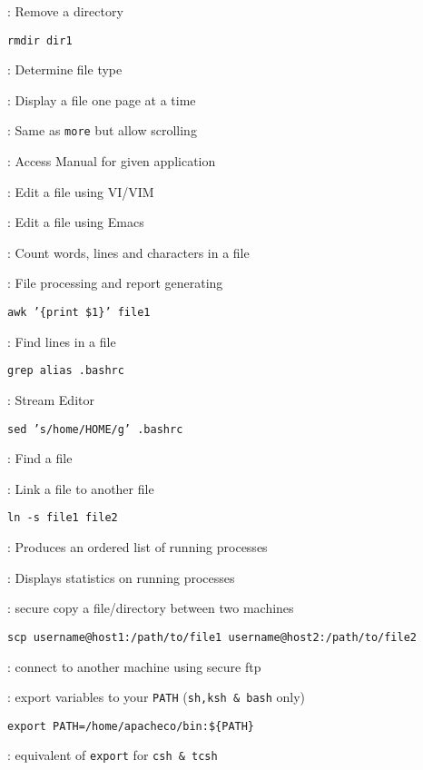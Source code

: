 \documentclass[slidestop,mathserif,compress,xcolor=svgnames]{beamer}
\newcommand*\vardiamond{\textcolor{tigerspurple}{%
  \ensuremath{\blacklozenge}}}
\begin{document}
\begin{frame}[allowframebreaks]
\begin{itemize}
{    \item[\texttt{rmdir}]: Remove a directory
    {\tiny\item[$\vardiamond$] \texttt{rmdir dir1}}
    \item[\texttt{file}]: Determine file type
    \item[\texttt{more}]: Display a file one page at a time
    \item[\texttt{less}]: Same as \texttt{more} but allow scrolling
    \item[\texttt{man}]: Access Manual for given application
    \item[\texttt{vi}]: Edit a file using VI/VIM
    \item[\texttt{emacs}]: Edit a file using Emacs
    \item[\texttt{wc}]: Count words, lines and characters in a file
    \item[\texttt{awk}]: File processing and report generating
    {\tiny\item[$\vardiamond$] \texttt{awk '\{print \$1\}' file1}}
    \framebreak
    \item[\texttt{grep}]: Find lines in a file
    {\tiny\item[$\vardiamond$] \texttt{grep alias .bashrc}}
    \item[\texttt{sed}]: Stream Editor
    {\tiny\item[$\vardiamond$] \texttt{sed 's/home/HOME/g' .bashrc}}
    \item[\texttt{find}]: Find a file
    \item[\texttt{ln}]: Link a file to another file
    {\tiny\item[$\vardiamond$] \texttt{ln -s file1 file2}}
    \item[\texttt{top}]: Produces an ordered list of running processes
    \item[\texttt{ps}]: Displays statistics on running processes
    \item[\texttt{scp}]: secure copy a file/directory between two machines
    {\tiny\item[$\vardiamond$] \texttt{scp username@host1:/path/to/file1 username@host2:/path/to/file2}}
    \item[\texttt{sftp}]: connect to another machine using secure ftp
    \item[\texttt{export}]: export variables to your \texttt{PATH} (\texttt{sh,ksh \& bash} only)
    {\tiny\item[$\vardiamond$] \texttt{export PATH=/home/apacheco/bin:\$\{PATH\}}}
    \item[\texttt{setenv}]: equivalent of \texttt{export} for \texttt{csh \& tcsh}
}
\end{itemize}
\end{frame}
\end{document}
